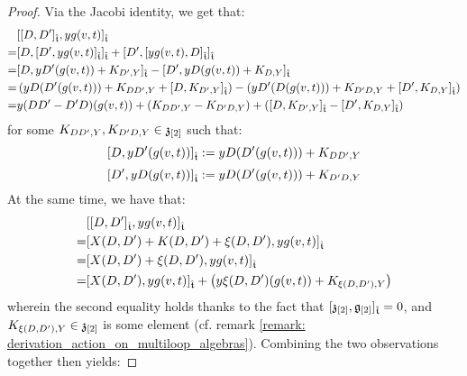 \begin{proof}
                Via the Jacobi identity, we get that:
                    $$
                        \begin{aligned}
                            & [ [D, D']_{\hat{\mathfrak{t}}}, y g(v, t) ]_{\hat{\mathfrak{t}}}
                            \\
                            = & [ D, [ D', y g(v, t) ]_{\hat{\mathfrak{t}}} ]_{\hat{\mathfrak{t}}} + [ D', [ y g(v, t), D ]_{\hat{\mathfrak{t}}} ]_{\hat{\mathfrak{t}}}
                            \\
                            = & [ D, y D'( g(v, t) ) + K_{D', Y} ]_{\hat{\mathfrak{t}}} - [ D', y D( g(v, t) ) + K_{D, Y} ]_{\hat{\mathfrak{t}}}
                            \\
                            = & \left( y D( D'(g(v, t)) ) + K_{DD', Y} + [ D, K_{D', Y} ]_{\hat{\mathfrak{t}}} \right) - \left( y D'( D(g(v, t)) ) + K_{D'D, Y} + [ D', K_{D, Y} ]_{\hat{\mathfrak{t}}} \right)
                            \\
                            = & y (DD' - D'D)( g(v, t) ) + ( K_{DD', Y} - K_{D'D, Y} ) + ( [ D, K_{D', Y} ]_{\hat{\mathfrak{t}}} - [ D', K_{D, Y} ]_{\hat{\mathfrak{t}}} )
                        \end{aligned}
                    $$
                for some $K_{DD', Y}, K_{D'D, Y} \in \mathfrak{z}_{[2]}$ such that:
                    $$[ D, y D'( g(v, t) ) ]_{\hat{\mathfrak{t}}} := y D( D'( g(v, t) ) ) + K_{DD', Y}$$
                    $$[ D', y D( g(v, t) ) ]_{\hat{\mathfrak{t}}} := y D( D'( g(v, t) ) ) + K_{D'D, Y}$$
                At the same time, we have that:
                    $$
                        \begin{aligned}
                            & [ [D, D']_{\hat{\mathfrak{t}}}, y g(v, t) ]_{\hat{\mathfrak{t}}}
                            \\
                            = & [ X(D, D') + K(D, D') + \xi(D, D') , y g(v, t) ]_{\hat{\mathfrak{t}}}
                            \\
                            = & [ X(D, D') + \xi(D, D') , y g(v, t) ]_{\hat{\mathfrak{t}}}
                            \\
                            = & [ X(D, D') , y g(v, t) ]_{\hat{\mathfrak{t}}} + \left( y \xi(D, D')(g(v, t)) + K_{\xi(D, D'), Y} \right)
                        \end{aligned}
                    $$
                wherein the second equality holds thanks to the fact that $[\mathfrak{z}_{[2]}, \mathfrak{g}_{[2]}]_{\hat{\mathfrak{t}}} = 0$, and $K_{\xi(D, D'), Y} \in \mathfrak{z}_{[2]}$ is some element (cf. remark \ref{remark: derivation_action_on_multiloop_algebras}). Combining the two observations together then yields:

\end{proof}
